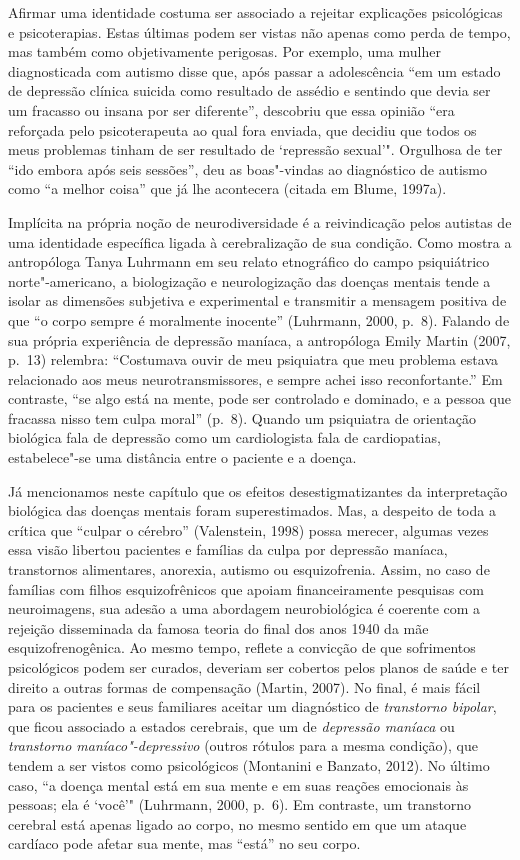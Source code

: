 Afirmar uma identidade costuma ser associado a rejeitar explicações
psicológicas e psicoterapias. Estas últimas podem ser vistas não apenas
como perda de tempo, mas também como objetivamente perigosas. Por
exemplo, uma mulher diagnosticada com autismo disse que, após passar a
adolescência ``em um estado de depressão clínica suicida como resultado
de assédio e sentindo que devia ser um fracasso ou insana por ser
diferente'', descobriu que essa opinião ``era reforçada pelo
psicoterapeuta ao qual fora enviada, que decidiu que todos os meus
problemas tinham de ser resultado de `repressão sexual'". Orgulhosa de
ter ``ido embora após seis sessões'', deu as boas"-vindas ao diagnóstico
de autismo como ``a melhor coisa'' que já lhe acontecera (citada em
Blume, 1997a).

Implícita na própria noção de neurodiversidade é a reivindicação pelos
autistas de uma identidade específica ligada à cerebralização de sua
condição. Como mostra a antropóloga Tanya Luhrmann em seu relato
etnográfico do campo psiquiátrico norte"-americano, a biologização e
neurologização das doenças mentais tende a isolar as dimensões subjetiva
e experimental e transmitir a mensagem positiva de que ``o corpo sempre
é moralmente inocente'' (Luhrmann, 2000, p.~8). Falando de sua própria
experiência de depressão maníaca, a antropóloga Emily Martin (2007,
p.~13) relembra: ``Costumava ouvir de meu psiquiatra que meu problema
estava relacionado aos meus neurotransmissores, e sempre achei isso
reconfortante.'' Em contraste, ``se algo está na mente, pode ser
controlado e dominado, e a pessoa que fracassa nisso tem culpa moral''
(p.~8). Quando um psiquiatra de orientação biológica fala de depressão
como um cardiologista fala de cardiopatias, estabelece"-se uma distância
entre o paciente e a doença.

Já mencionamos neste capítulo que os efeitos desestigmatizantes da
interpretação biológica das doenças mentais foram superestimados. Mas, a
despeito de toda a crítica que ``culpar o cérebro'' (Valenstein, 1998)
possa merecer, algumas vezes essa visão libertou pacientes e famílias da
culpa por depressão maníaca, transtornos alimentares, anorexia, autismo
ou esquizofrenia. Assim, no caso de famílias com filhos esquizofrênicos
que apoiam financeiramente pesquisas com neuroimagens, sua adesão a uma
abordagem neurobiológica é coerente com a rejeição disseminada da famosa
teoria do final dos anos 1940 da mãe esquizofrenogênica. Ao mesmo tempo,
reflete a convicção de que sofrimentos psicológicos podem ser curados,
deveriam ser cobertos pelos planos de saúde e ter direito a outras
formas de compensação (Martin, 2007). No final, é mais fácil para os
pacientes e seus familiares aceitar um diagnóstico de \emph{transtorno
bipolar}, que ficou associado a estados cerebrais, que um de
\emph{depressão maníaca} ou \emph{transtorno maníaco"-depressivo} (outros
rótulos para a mesma condição), que tendem a ser vistos como
psicológicos (Montanini e Banzato, 2012). No último caso, ``a doença
mental está em sua mente e em suas reações emocionais às pessoas; ela é
`você'" (Luhrmann, 2000, p.~6). Em contraste, um transtorno cerebral
está apenas ligado ao corpo, no mesmo sentido em que um ataque cardíaco
pode afetar sua mente, mas ``está'' no seu corpo.

